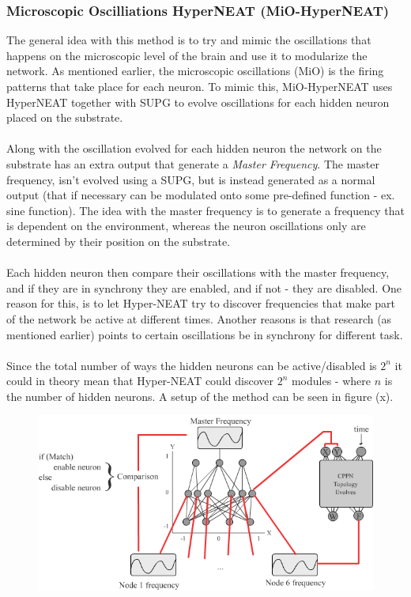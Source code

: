 \documentclass[11pt, a4paper]{article}
\begin{document}
\subsubsection{Microscopic Oscilliations HyperNEAT (MiO-HyperNEAT)}
The general idea with this method is to try and mimic the oscillations that happens on the microscopic level of the brain and use it to modularize the network. As mentioned earlier, the microscopic oscillations (MiO) is the firing patterns that take place for each neuron. To mimic this, MiO-HyperNEAT uses HyperNEAT together with SUPG to evolve oscillations for each hidden neuron placed on the substrate.
\\
\\
Along with the oscillation evolved for each hidden neuron the network on the substrate has an extra output that generate a \textit{Master Frequency}. The master frequency, isn't evolved using a SUPG, but is instead generated as a normal output (that if necessary can be modulated onto some pre-defined function - ex. sine function). The idea with the master frequency is to generate a frequency that is dependent on the environment, whereas the neuron oscillations only are determined by their position on the substrate.
\\
\\
Each hidden neuron then compare their oscillations with the master frequency, and if they are in synchrony they are enabled, and if not - they are disabled. One reason for this, is to let Hyper-NEAT try to discover frequencies that make part of the network be active at different times. Another reasons is that research (as mentioned earlier) points to certain oscillations be in synchrony for different task.
\\
\\
Since the total number of ways the hidden neurons can be active/disabled is $ 2^n $ it could in theory mean that Hyper-NEAT could discover $ 2^n $ modules - where $ n $ is the number of hidden neurons. A setup of the method can be seen in figure (x).
\begin{figure}[!ht]
\centering
\includegraphics[scale=0.5]{MiO-HyperNEAT}
\caption{}
\end{figure}
\\
\end{document}
